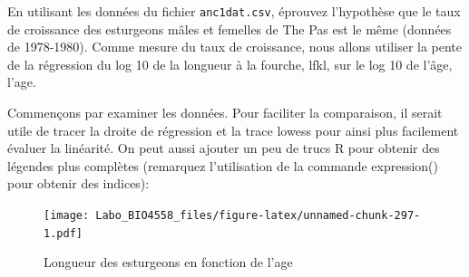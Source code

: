 \documentclass[12pt,]{book}
\makeatletter
\newenvironment{Shaded}{\begin{snugshade}}{\end{snugshade}}
\newcommand{\DataTypeTok}[1]{\textcolor[rgb]{0.13,0.29,0.53}{#1}}
\newcommand{\DecValTok}[1]{\textcolor[rgb]{0.00,0.00,0.81}{#1}}
\newcommand{\KeywordTok}[1]{\textcolor[rgb]{0.13,0.29,0.53}{\textbf{#1}}}
\newcommand{\NormalTok}[1]{#1}
\newcommand{\OperatorTok}[1]{\textcolor[rgb]{0.81,0.36,0.00}{\textbf{#1}}}
\newcommand{\OtherTok}[1]{\textcolor[rgb]{0.56,0.35,0.01}{#1}}
\newcommand{\StringTok}[1]{\textcolor[rgb]{0.31,0.60,0.02}{#1}}
\newenvironment{kframe}{%
\medskip{}
\setlength{\fboxsep}{.8em}
\def\at@end@of@kframe{}%
\ifinner\ifhmode%
 \def\at@end@of@kframe{\end{minipage}}%
 \begin{minipage}{\columnwidth}%
\fi\fi%
\def\FrameCommand##1{\hskip\@totalleftmargin \hskip-\fboxsep
\colorbox{incolor}{##1}\hskip-\fboxsep
    \hskip-\linewidth \hskip-\@totalleftmargin \hskip\columnwidth}%
\MakeFramed {\advance\hsize-\width
  \@totalleftmargin\z@ \linewidth\hsize
  \@setminipage}}%
{\par\unskip\endMakeFramed%
\at@end@of@kframe}
\newenvironment{rmdblock}[1]
 {
 \begin{itemize}
 \renewcommand{\labelitemi}{
   \raisebox{-.7\height}[0pt][0pt]{
     {\setkeys{Gin}{width=3em,keepaspectratio}\texttt{[image: images/\#1]}}
   }
 }
 \begin{kframe}
 \setlength{\fboxsep}{1em}
 \item
 }
 {
 \end{kframe}
 \end{itemize}
 }
\newenvironment{rmdcode}
  {\begin{rmdblock}{screen}}
  {\end{rmdblock}}
\makeatother
\begin{document}
\begin{rmdcode}
En utilisant les données du fichier \texttt{anc1dat.csv}, éprouvez l'hypothèse que le taux de croissance des esturgeons mâles et femelles de The Pas est le même (données de 1978-1980). Comme mesure du taux de croissance, nous allons utiliser la pente de la régression du log 10 de la longueur à la fourche, lfkl, sur le log 10 de l'âge, l'age.
\end{rmdcode}

Commençons par examiner les données. Pour faciliter la comparaison, il serait utile de tracer la droite de régression et la trace lowess pour ainsi plus facilement évaluer la linéarité. On peut aussi ajouter un peu de trucs R pour obtenir des légendes plus complètes (remarquez l'utilisation de la commande expression() pour obtenir des indices):

\begin{Shaded}
\end{Shaded}

\begin{figure}
\centering
\texttt{[image: Labo\_BIO4558\_files/figure-latex/unnamed-chunk-297-1.pdf]}
\caption{\label{fig:unnamed-chunk-297}Longueur des esturgeons en fonction de l'age}
\end{figure}
\end{document}
